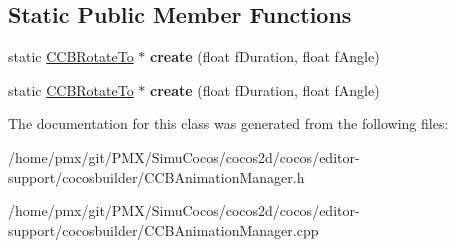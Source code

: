 \subsection*{Static Public Member Functions}
\begin{DoxyCompactItemize}
\item 
\mbox{\label{classcocosbuilder_1_1CCBRotateTo_a098e1863080c2eee2a130d42fd1e7ecf}} 
static \hyperlink{classcocosbuilder_1_1CCBRotateTo}{C\+C\+B\+Rotate\+To} $\ast$ {\bfseries create} (float f\+Duration, float f\+Angle)
\item 
\mbox{\label{classcocosbuilder_1_1CCBRotateTo_a9514e67919cd4d63343b93ba246407d7}} 
static \hyperlink{classcocosbuilder_1_1CCBRotateTo}{C\+C\+B\+Rotate\+To} $\ast$ {\bfseries create} (float f\+Duration, float f\+Angle)
\end{DoxyCompactItemize}


The documentation for this class was generated from the following files\+:\begin{DoxyCompactItemize}
\item 
/home/pmx/git/\+P\+M\+X/\+Simu\+Cocos/cocos2d/cocos/editor-\/support/cocosbuilder/C\+C\+B\+Animation\+Manager.\+h\item 
/home/pmx/git/\+P\+M\+X/\+Simu\+Cocos/cocos2d/cocos/editor-\/support/cocosbuilder/C\+C\+B\+Animation\+Manager.\+cpp\end{DoxyCompactItemize}

